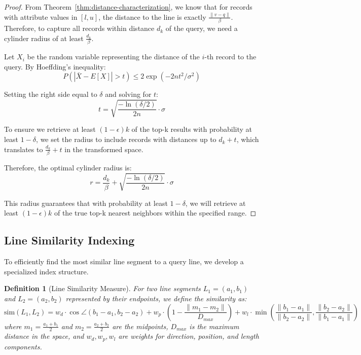 \documentclass[numbers,sort]{article}
\newtheorem{definition}{Definition}
\begin{document}
\begin{proof}
From Theorem~\ref{thm:distance-characterization}, we know that for records with attribute values in $[l, u]$, the distance to the line is exactly $\frac{\|v - q\|}{\beta}$. Therefore, to capture all records within distance $d_k$ of the query, we need a cylinder radius of at least $\frac{d_k}{\beta}$.

Let $X_i$ be the random variable representing the distance of the $i$-th record to the query. By Hoeffding's inequality:
\begin{equation}
P(|\bar{X} - E[X]| > t) \leq 2\exp(-2nt^2/\sigma^2)
\end{equation}

Setting the right side equal to $\delta$ and solving for $t$:
\begin{equation}
t = \sqrt{\frac{-\ln(\delta/2)}{2n}} \cdot \sigma
\end{equation}

To ensure we retrieve at least $(1-\epsilon)k$ of the top-k results with probability at least $1-\delta$, we set the radius to include records with distances up to $d_k + t$, which translates to $\frac{d_k}{\beta} + t$ in the transformed space.

Therefore, the optimal cylinder radius is:
\begin{equation}
r = \frac{d_k}{\beta} + \sqrt{\frac{-\ln(\delta/2)}{2n}} \cdot \sigma
\end{equation}

This radius guarantees that with probability at least $1-\delta$, we will retrieve at least $(1-\epsilon)k$ of the true top-k nearest neighbors within the specified range.
\end{proof}

\subsection{Line Similarity Indexing}
\label{sec:line-sim-idx}

To efficiently find the most similar line segment to a query line, we develop a specialized index structure.

\begin{definition}[Line Similarity Measure]
\label{def:line-sim}
For two line segments $L_1 = (a_1, b_1)$ and $L_2 = (a_2, b_2)$ represented by their endpoints, we define the similarity as:
\begin{equation}
\label{eq:line-sim}
\text{sim}(L_1, L_2) = w_d \cdot \cos\angle(b_1-a_1, b_2-a_2) + w_p \cdot \left(1 - \frac{\|m_1 - m_2\|}{D_{max}}\right) + w_l \cdot \min\left(\frac{\|b_1-a_1\|}{\|b_2-a_2\|}, \frac{\|b_2-a_2\|}{\|b_1-a_1\|}\right)
\end{equation}
where $m_1 = \frac{a_1+b_1}{2}$ and $m_2 = \frac{a_2+b_2}{2}$ are the midpoints, $D_{max}$ is the maximum distance in the space, and $w_d, w_p, w_l$ are weights for direction, position, and length components.
\end{definition}
\end{document}
